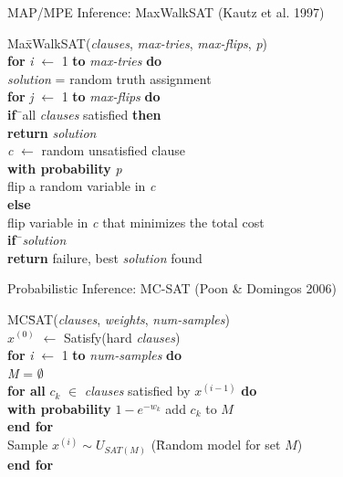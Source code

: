 \documentclass{beamer}
\begin{document}
\begin{frame}{MAP/MPE Inference: MaxWalkSAT (Kautz et al. 1997)}
	\begin{tabbing}
		Ma\=xWalkSAT(\textit{clauses}, \textit{max-tries}, \textit{max-flips}, \textit{p})\\
		\>\textbf{fo}\=\textbf{r} \textit{i} $\leftarrow$ 1 \textbf{to} \textit{max-tries} \textbf{do}\\
		\>\>  \textit{solution} = random truth assignment\\
		\>\>  \textbf{fo}\=\textbf{r} \textit{j} $\leftarrow$ 1 \textbf{to} \textit{max-flips} \textbf{do}\\
		\>\>\>    \textbf{if}\= \ all \textit{clauses} satisfied \textbf{then}\\
		\>\>\>\>      \textbf{return} \textit{solution}\\
		\>\>\>    \textit{c} $\leftarrow$ random unsatisfied clause\\
		\>\>\>    \textbf{with probability} \textit{p}\\
		\>\>\>\>      flip a random variable in \textit{c}\\
		\>\>\>    \textbf{else}\\
		\>\>\>\>      flip variable in \textit{c} that minimizes the total cost\\
		\>\>\>    \textbf{if}\= \ \textit{solution} \\
		\> \textbf{return} failure, best \textit{solution} found\\
	\end{tabbing}

\end{frame}

\begin{frame}{Probabilistic Inference: MC-SAT (Poon \& Domingos 2006)}

	\begin{tabbing}
		MC\=SAT(\textit{clauses}, \textit{weights}, \textit{num-samples})\\
		\> $x^{(0)}$ $\leftarrow$ Satisfy(hard \textit{clauses}) \\
		\>\textbf{fo}\=\textbf{r} \textit{i} $\leftarrow$ 1 \textbf{to} \textit{num-samples} \textbf{do}\\
		\>\>  \textit{M} = $\emptyset$\\
		\>\>  \textbf{fo}\=\textbf{r all} $c_k$ $\in$ \textit{clauses} satisfied by
		$x^{(i-1)}$ \textbf{do}\\
		\>\>\>    \textbf{wi}\=\textbf{th probability} $1 - e^{-w_k}$ add $c_k$ to
		$M$\\
		\>\> \textbf{end for}\\
		\>\> Sample $x^{(i)} \sim U_{SAT(M)}$ (\=Random model for set $M$)\\
		\> \textbf{end for}
	\end{tabbing}

\end{frame}
\end{document}
